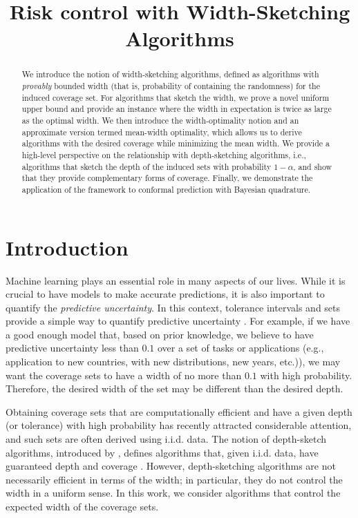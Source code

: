 
\title{Risk control with Width-Sketching Algorithms}

\begin{abstract}
  We introduce the notion of width-sketching algorithms, defined as algorithms with \emph{provably} bounded width (that is, probability of containing the randomness) for the induced coverage set. For algorithms that sketch the width, we prove a novel uniform upper bound and provide an instance where the width in expectation is twice as large as the optimal width. We then introduce the width-optimality notion and an approximate version termed mean-width optimality, which allows us to derive algorithms with the desired coverage while minimizing the mean width. We provide a high-level perspective on the relationship with depth-sketching algorithms, i.e., algorithms that sketch the depth of the induced sets with probability $1- \alpha$, and show that they provide complementary forms of coverage. Finally, we demonstrate the application of the framework to conformal prediction with Bayesian quadrature.
\end{abstract}

\section{Introduction}



Machine learning plays an essential role in many aspects of our lives. While it is crucial to have models to make accurate predictions, it is also important to quantify the \emph{predictive uncertainty}. In this context, tolerance intervals and sets provide a simple way to quantify predictive uncertainty \citep[see, e.g.,][for an introduction]{guttman1970statistical}. For example, if we have a good enough model that, based on prior knowledge, we believe to have predictive uncertainty less than $0.1$ over a set of tasks or applications
 (e.g., application to new countries, with new distributions,  new years, etc.)), we may want the coverage sets to have a width of no more than $0.1$ with high probability. Therefore, the desired width of the set may be different than the desired depth.

Obtaining coverage sets that are computationally efficient and have a given depth (or tolerance) with high probability has recently attracted considerable attention, and such sets are often derived using i.i.d. data. The notion of depth-sketch algorithms, introduced by \cite{barber2021limits}, defines algorithms that, given i.i.d. data, have guaranteed depth and coverage \citep[see, e.g.,][]{bates2021distributionfree,angelopoulos2024conformal}. However, depth-sketching algorithms are not necessarily efficient in terms of the width; in particular, they do not control the width in a uniform sense. In this work, we consider algorithms that control the expected width of the coverage sets.

